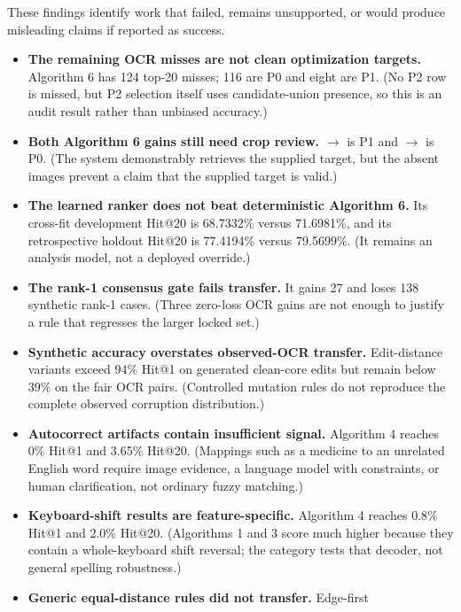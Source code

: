 \documentclass[11pt,a4paper]{article}
\newcommand{\code}[1]{\texttt{\detokenize{#1}}}
\begin{document}
These findings identify work that failed, remains unsupported, or would produce
misleading claims if reported as success.

\begin{itemize}
  \item \textbf{The remaining OCR misses are not clean optimization targets.}
        Algorithm 6 has 124 top-20 misses; 116 are P0 and eight are P1.
        (No P2 row is missed, but P2 selection itself uses candidate-union
        presence, so this is an audit result rather than unbiased accuracy.)
  \item \textbf{Both Algorithm 6 gains still need crop review.}
        \code{LACTULOSE}$\rightarrow$\code{LACTO} is P1 and
        \code{TEFA}$\rightarrow$\code{TELFAST} is P0. (The system demonstrably
        retrieves the supplied target, but the absent images prevent a claim
        that the supplied target is valid.)
  \item \textbf{The learned ranker does not beat deterministic Algorithm 6.}
        Its cross-fit development Hit@20 is 68.7332\% versus 71.6981\%, and its
        retrospective holdout Hit@20 is 77.4194\% versus 79.5699\%.
        (It remains an analysis model, not a deployed override.)
  \item \textbf{The rank-1 consensus gate fails transfer.} It gains 27 and
        loses 138 synthetic rank-1 cases. (Three zero-loss OCR gains are not
        enough to justify a rule that regresses the larger locked set.)
  \item \textbf{Synthetic accuracy overstates observed-OCR transfer.}
        Edit-distance variants exceed 94\% Hit@1 on generated clean-core edits
        but remain below 39\% on the fair OCR pairs. (Controlled mutation rules
        do not reproduce the complete observed corruption distribution.)
  \item \textbf{Autocorrect artifacts contain insufficient signal.} Algorithm 4
        reaches 0\% Hit@1 and 3.65\% Hit@20. (Mappings such as a medicine to an
        unrelated English word require image evidence, a language model with
        constraints, or human clarification, not ordinary fuzzy matching.)
  \item \textbf{Keyboard-shift results are feature-specific.} Algorithm 4 reaches
        0.8\% Hit@1 and 2.0\% Hit@20. (Algorithms 1 and 3 score much higher
        because they contain a whole-keyboard shift reversal; the category tests
        that decoder, not general spelling robustness.)
  \item \textbf{Generic equal-distance rules did not transfer.} Edge-first

\end{itemize}
\end{document}
